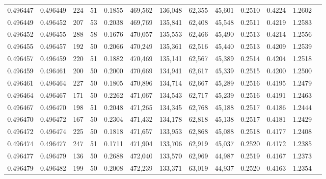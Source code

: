 \begin{tabular}{rrrrrrrrrrrrr}
0.496447 & 0.496449 &   224 &  51 &                                     0.1855 & 469,562 & 136,048 &  62,355 &  45,601 & 0.2510 & 0.4224 & 1.2602 \\
0.496449 & 0.496452 &   207 &  53 &                                     0.2038 & 469,769 & 135,841 &  62,408 &  45,548 & 0.2511 & 0.4219 & 1.2583 \\
0.496452 & 0.496455 &   288 &  58 &                                     0.1676 & 470,057 & 135,553 &  62,466 &  45,490 & 0.2513 & 0.4214 & 1.2556 \\
0.496455 & 0.496457 &   192 &  50 &                                     0.2066 & 470,249 & 135,361 &  62,516 &  45,440 & 0.2513 & 0.4209 & 1.2539 \\
0.496457 & 0.496459 &   220 &  51 &                                     0.1882 & 470,469 & 135,141 &  62,567 &  45,389 & 0.2514 & 0.4204 & 1.2518 \\
0.496459 & 0.496461 &   200 &  50 &                                     0.2000 & 470,669 & 134,941 &  62,617 &  45,339 & 0.2515 & 0.4200 & 1.2500 \\
0.496461 & 0.496464 &   227 &  50 &                                     0.1805 & 470,896 & 134,714 &  62,667 &  45,289 & 0.2516 & 0.4195 & 1.2479 \\
0.496464 & 0.496467 &   171 &  50 &                                     0.2262 & 471,067 & 134,543 &  62,717 &  45,239 & 0.2516 & 0.4191 & 1.2463 \\
0.496467 & 0.496470 &   198 &  51 &                                     0.2048 & 471,265 & 134,345 &  62,768 &  45,188 & 0.2517 & 0.4186 & 1.2444 \\
0.496470 & 0.496472 &   167 &  50 &                                     0.2304 & 471,432 & 134,178 &  62,818 &  45,138 & 0.2517 & 0.4181 & 1.2429 \\
0.496472 & 0.496474 &   225 &  50 &                                     0.1818 & 471,657 & 133,953 &  62,868 &  45,088 & 0.2518 & 0.4177 & 1.2408 \\
0.496474 & 0.496477 &   247 &  51 &                                     0.1711 & 471,904 & 133,706 &  62,919 &  45,037 & 0.2520 & 0.4172 & 1.2385 \\
0.496477 & 0.496479 &   136 &  50 &                                     0.2688 & 472,040 & 133,570 &  62,969 &  44,987 & 0.2519 & 0.4167 & 1.2373 \\
0.496479 & 0.496482 &   199 &  50 &                                     0.2008 & 472,239 & 133,371 &  63,019 &  44,937 & 0.2520 & 0.4163 & 1.2354 \\

\end{tabular}
